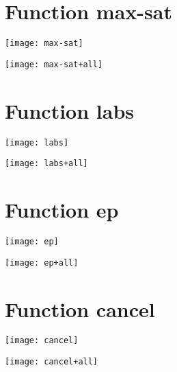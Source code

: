 \section{Function max-sat}
\begin{center}

\end{center}
\begin{center}

\end{center}
\begin{center}
\texttt{[image: max-sat]}
\end{center}
\begin{center}
\texttt{[image: max-sat+all]}
\end{center}
\newpage
\section{Function labs}
\begin{center}

\end{center}
\begin{center}

\end{center}
\begin{center}
\texttt{[image: labs]}
\end{center}
\begin{center}
\texttt{[image: labs+all]}
\end{center}
\newpage
\section{Function ep}
\begin{center}

\end{center}
\begin{center}

\end{center}
\begin{center}
\texttt{[image: ep]}
\end{center}
\begin{center}
\texttt{[image: ep+all]}
\end{center}
\newpage
\section{Function cancel}
\begin{center}

\end{center}
\begin{center}

\end{center}
\begin{center}
\texttt{[image: cancel]}
\end{center}
\begin{center}
\texttt{[image: cancel+all]}
\end{center}
\newpage
